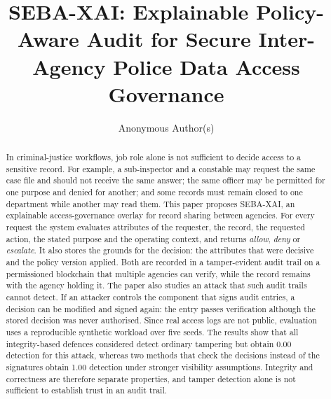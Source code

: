 \documentclass[sigconf,authordraft]{acmart}
\begin{document}
\title{SEBA-XAI: Explainable Policy-Aware Audit for Secure Inter-Agency
Police Data Access Governance}

\author{Anonymous Author(s)}

\begin{abstract}
In criminal-justice workflows, job role alone is not sufficient to decide
access to a sensitive record. For example, a sub-inspector and a constable may
request the same case file and should not receive the same answer; the same
officer may be permitted for one purpose and denied for another; and some
records must remain closed to one department while another may read them. This
paper proposes SEBA-XAI, an explainable access-governance overlay for record
sharing between agencies. For every request the system evaluates attributes of
the requester, the record, the requested action, the stated purpose and the
operating context, and returns \emph{allow}, \emph{deny} or \emph{escalate}. It
also stores the grounds for the decision: the attributes that were decisive and
the policy version applied. Both are recorded in a tamper-evident audit trail on
a permissioned blockchain that multiple agencies can verify, while the record
remains with the agency holding it. The paper also studies an attack that such
audit trails cannot detect. If an attacker controls the component that signs
audit entries, a decision can be modified and signed again: the entry passes
verification although the stored decision was never authorised. Since real
access logs are not public, evaluation uses a reproducible synthetic workload
over five seeds. The results show that all integrity-based defences considered
detect ordinary tampering but obtain 0.00 detection for this attack, whereas two
methods that check the decisions instead of the signatures obtain 1.00 detection
under stronger visibility assumptions. Integrity and correctness are therefore
separate properties, and tamper detection alone is not sufficient to establish
trust in an audit trail.
\end{abstract}
\end{document}
